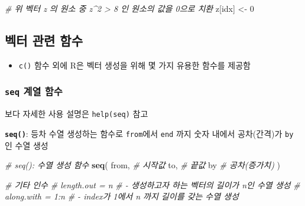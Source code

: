 \documentclass[
  11pt,
]{krantz}
\makeatletter
\newenvironment{Shaded}{\begin{snugshade}}{\end{snugshade}}
\newcommand{\CommentTok}[1]{\textcolor[rgb]{0.37,0.37,0.37}{\textit{#1}}}
\newcommand{\DecValTok}[1]{\textcolor[rgb]{0.06,0.06,0.06}{#1}}
\newcommand{\KeywordTok}[1]{\textcolor[rgb]{0.27,0.27,0.27}{\textbf{#1}}}
\newcommand{\NormalTok}[1]{#1}
\newcommand{\StringTok}[1]{\textcolor[rgb]{0.5,0.5,0.5}{#1}}
\providecommand{\tightlist}{%
  \setlength{\itemsep}{0pt}\setlength{\parskip}{0pt}}
\newenvironment{kframe}{%
\medskip{}
\setlength{\fboxsep}{.8em}
 \def\at@end@of@kframe{}%
 \ifinner\ifhmode%
  \def\at@end@of@kframe{\end{minipage}}%
  \begin{minipage}{\columnwidth}%
 \fi\fi%
 \def\FrameCommand##1{\hskip\@totalleftmargin \hskip-\fboxsep
 \colorbox{shadecolor}{##1}\hskip-\fboxsep
     \hskip-\linewidth \hskip-\@totalleftmargin \hskip\columnwidth}%
 \MakeFramed {\advance\hsize-\width
   \@totalleftmargin\z@ \linewidth\hsize
   \@setminipage}}%
 {\par\unskip\endMakeFramed%
 \at@end@of@kframe}
\renewenvironment{quote}{\begin{kframe}}{\end{kframe}}
\makeatother
\begin{document}
\footnotesize

\begin{Shaded}
\begin{Highlighting}[]
\CommentTok{# 위 벡터 z 의 원소 중 z^2 > 8 인 원소의 값을 0으로 치환}
\NormalTok{z[idx] <-}\StringTok{ }\DecValTok{0}
\end{Highlighting}
\end{Shaded}

\normalsize

\hypertarget{vector-function}{%
\subsection{벡터 관련 함수}\label{vector-function}}

\begin{itemize}
\tightlist
\item
  \texttt{c()} 함수 외에 R은 벡터 생성을 위해 몇 가지 유용한 함수를 제공함
\end{itemize}

\hypertarget{fun-seq}{%
\subsubsection*{\texorpdfstring{\textbf{\texttt{seq}} 계열 함수}{seq 계열 함수}}\label{fun-seq}}


\begin{quote}
보다 자세한 사용 설명은 \texttt{help(seq)} 참고
\end{quote}

\textbf{\texttt{seq()}}: 등차 수열 생성하는 함수로 \texttt{from}에서 \texttt{end} 까지 숫자 내에서 공차(간격)가 \texttt{by} 인 수열 생성

\footnotesize

\begin{Shaded}
\begin{Highlighting}[]
\CommentTok{# seq(): 수열 생성 함수}
\KeywordTok{seq}\NormalTok{(}
\NormalTok{  from, }\CommentTok{# 시작값}
\NormalTok{  to,   }\CommentTok{# 끝값}
\NormalTok{  by    }\CommentTok{# 공차(증가치)}
\NormalTok{)}

\CommentTok{# 기타 인수}
\CommentTok{# length.out = n}
\CommentTok{#   - 생성하고자 하는 벡터의 길이가 n인 수열 생성}
\CommentTok{# along.with = 1:n }
\CommentTok{#   - index가 1에서 n 까지 길이를 갖는 수열 생성}
\end{Highlighting}
\end{Shaded}

\normalsize
\end{document}
